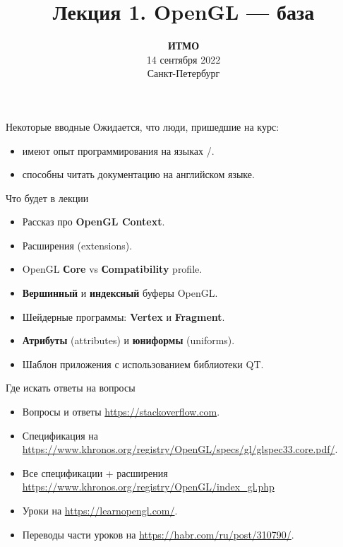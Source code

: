 \documentclass[aspectration=1610,t]{beamer}
\title{Лекция 1. OpenGL --- база}
\date{
   \textbf{ИТМО}\\
   14 сентября 2022\\
   Санкт-Петербург
}
\begin{document}
\begin{frame}
  \titlepage
\end{frame}

\begin{frame}[fragile]{Некоторые вводные}
    Ожидается, что люди, пришедшие на курс:
    \begin{itemize}
        \item имеют опыт программирования на языках \langc/\langcpp.
        \item способны читать документацию на английском языке.
    \end{itemize}
\end{frame}

\begin{frame}[fragile]{Что будет в лекции}
    \begin{itemize}
        \item Рассказ про {\bf OpenGL Context}.
        \item Расширения (extensions).
        \item OpenGL {\bf Сore} vs {\bf Сompatibility} profile.
        \item {\bf Вершинный} и {\bf индексный} буферы OpenGL.
        \item Шейдерные программы: {\bf Vertex} и {\bf Fragment}.
        \item {\bf Атрибуты} (attributes) и {\bf юниформы} (uniforms).
        \item Шаблон приложения с использованием библиотеки QT.
    \end{itemize}
\end{frame}

\begin{frame}[fragile]{Где искать ответы на вопросы}
    \begin{itemize}
        \item Вопросы и ответы \url{https://stackoverflow.com}.
        \item Спецификация на \url{https://www.khronos.org/registry/OpenGL/specs/gl/glspec33.core.pdf/}.
        \item Все спецификации + расширения \url{https://www.khronos.org/registry/OpenGL/index_gl.php}
        \item Уроки на \url{https://learnopengl.com/}.
        \item Переводы части уроков на \url{https://habr.com/ru/post/310790/}.
    \end{itemize}
\end{frame}
\end{document}
